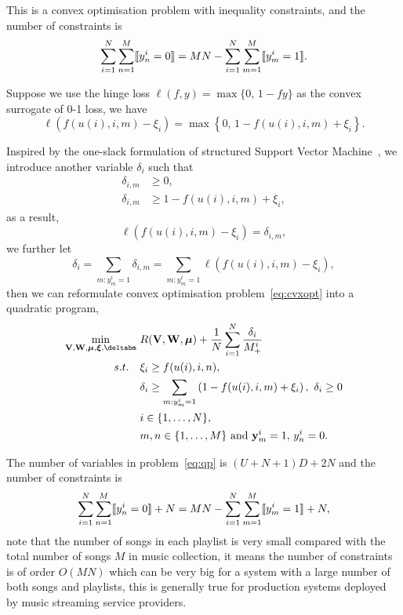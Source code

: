 This is a convex optimisation problem with inequality constraints, 
and the number of constraints is 
$$
\sum_{i=1}^N \sum_{n=1}^M \llbracket y_n^i = 0 \rrbracket = MN - \sum_{i=1}^N \sum_{m=1}^M \llbracket y_m^i = 1 \rrbracket.
$$

Suppose we use the hinge loss $\ell(f, y) = \max \{ 0, \, 1 - fy \}$ as the convex surrogate of 0-1 loss, we have
\begin{equation*}
\ell \left( f(u(i), i, m) - \xi_i \right) = \max \left\{ 0, \, 1 - f( u(i), i, m) + \xi_i \right\}.
\end{equation*}

Inspired by the one-slack formulation of structured Support Vector Machine~\cite{joachims2009cutting}, 
we introduce another variable $\delta_i$ such that
\begin{equation*}
\begin{aligned}
\delta_{i,m} & \ge 0, \\
\delta_{i,m} & \ge 1 - f( u(i), i, m) + \xi_i, 
\end{aligned}
\end{equation*}
as a result,
\begin{equation*}
\ell \left( f(u(i), i, m) - \xi_i \right) = \delta_{i,m},
\end{equation*}
we further let
\begin{equation*}
\delta_i = \sum_{m: y_m^i = 1} \delta_{i,m} = \sum_{m: y_m^i = 1} \ell \left( f(u(i), i, m) - \xi_i \right),
\end{equation*}
then we can reformulate convex optimisation problem~\ref{eq:cvxopt} into a quadratic program,
\begin{equation}
\label{eq:qp}
\begin{aligned}
\min_{\V, \W, \mubm, \xibm, \deltabm} \ & R(\V, \W, \mubm) + \frac{1}{N} \sum_{i=1}^N \frac{\delta_i}{M_+^i} \\
s.t. \quad 
& \xi_i \ge f(u(i), i, n), \\
& \delta_i \ge \sum_{m: y_m^i = 1} \left( 1 - f( u(i), i, m) + \xi_i \right), \ \delta_i \ge 0 \\
& i \in \{1,\dots,N\}, \\
& m, n \in \{1,\dots,M\} \ \mathrm{and} \ \y_m^i = 1, \,  y_n^i = 0. 
\end{aligned}
\end{equation}

The number of variables in problem~\ref{eq:qp} is $(U + N + 1) D + 2N$ and the number of constraints is
$$
\sum_{i=1}^N \sum_{n=1}^M \llbracket y_n^i = 0 \rrbracket + N = MN - \sum_{i=1}^N \sum_{m=1}^M \llbracket y_m^i = 1 \rrbracket + N,
$$
%
note that the number of songs in each playlist is very small compared with the total number of songs $M$ in music collection,
it means the number of constraints is of order $O(MN)$ which can be very big for a system with a large number of both songs and playlists,
this is generally true for production systems deployed by music streaming service providers.

